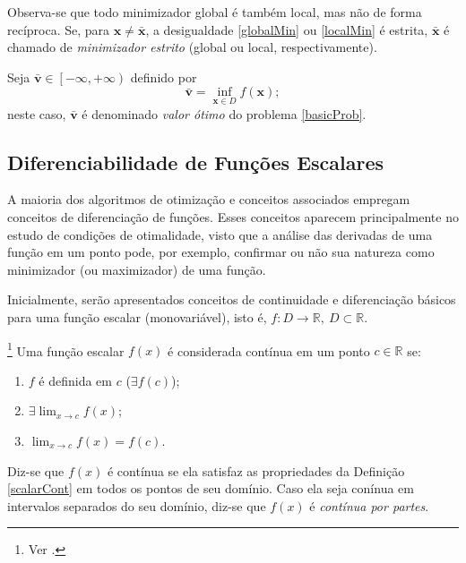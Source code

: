 Observa-se que todo minimizador global \'{e} tamb\'{e}m local, mas n\~{a}o de forma rec\'{i}proca. Se, para $\mathbf{x} \ne \bar{\mathbf{x}}$, a desigualdade \eqref{globalMin} ou \eqref{localMin} \'{e} estrita, $\bar{\mathbf{x}}$ \'{e} chamado de \textit{minimizador estrito} (global ou local, respectivamente).

\begin{definition} 
Seja $\bar{\mathbf{v}} \in \left[ -\infty,+\infty \right)$ definido por
\begin{equation}
\bar{\mathbf{v}} = \inf_{\mathbf{x} \in D} f(\mathbf{x});
\end{equation}
neste caso, $\bar{\mathbf{v}}$ \'{e} denominado \textit{valor \'{o}timo} do problema \eqref{basicProb}.
\end{definition} 

\subsection{Diferenciabilidade de Fun\c{c}\~{o}es Escalares}

A maioria dos algoritmos de otimiza\c{c}\~{a}o e conceitos associados empregam conceitos de diferencia\c{c}\~{a}o de fun\c{c}\~{o}es. Esses conceitos aparecem principalmente no estudo de condi\c{c}\~{o}es de otimalidade, visto que a an\'{a}lise das derivadas de uma fun\c{c}\~{a}o em um ponto pode, por exemplo, confirmar ou n\~{a}o sua natureza como minimizador (ou maximizador) de uma fun\c{c}\~{a}o.

Inicialmente, ser\~{a}o apresentados conceitos de continuidade e diferencia\c{c}\~{a}o b\'{a}sicos para uma fun\c{c}\~{a}o escalar (monovari\'{a}vel), isto \'{e}, $f: D \to \mathbb{R},~D \subset \mathbb{R}$.

\begin{definition}\footnote{Ver \cite[p. 120]{thomas1}.} \label {scalarCont} 
Uma fun\c{c}\~{a}o escalar $f(x)$ \'{e} considerada cont\'{i}nua em um ponto $c \in \mathbb{R}$ se:
\begin{enumerate}[label=(\alph*)]
\item $f$ \'{e} definida em $c$ ($\exists f(c)$);
\item $\exists \lim_{x \to c} f(x)$;
\item $\lim_{x \to c} f(x) = f(c)$.
\end{enumerate}
\end{definition}

Diz-se que $f(x)$ \'{e} cont\'{i}nua se ela satisfaz as propriedades da Defini\c{c}\~{a}o \ref{scalarCont} em todos os pontos de seu dom\'{i}nio. Caso ela seja con\'{i}nua em intervalos separados do seu dom\'{i}nio, diz-se que $f(x)$ \'{e} \textit{cont\'{i}nua por partes}.

